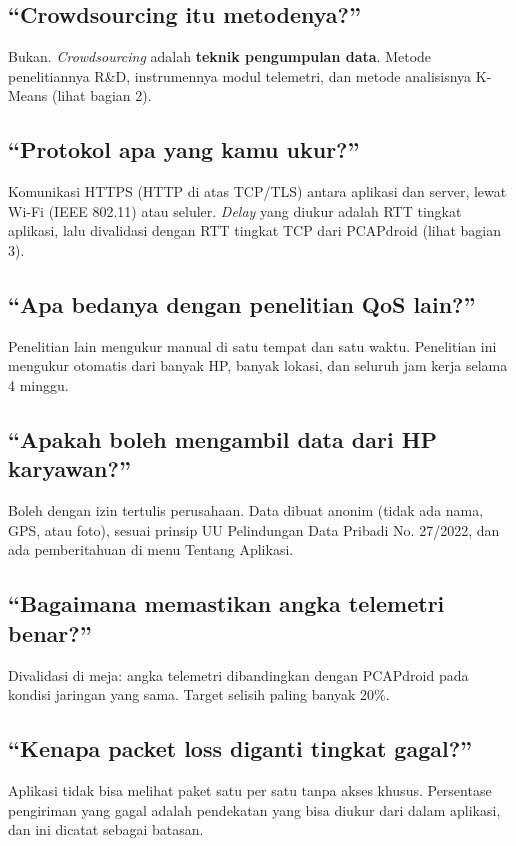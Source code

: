 \documentclass[11pt,a4paper]{article}
\begin{document}
\subsection{``Crowdsourcing itu metodenya?''}
Bukan. \textit{Crowdsourcing} adalah \textbf{teknik pengumpulan data}. Metode penelitiannya R\&D, instrumennya modul telemetri, dan metode analisisnya K-Means (lihat bagian 2).

\subsection{``Protokol apa yang kamu ukur?''}
Komunikasi HTTPS (HTTP di atas TCP/TLS) antara aplikasi dan server, lewat Wi-Fi (IEEE 802.11) atau seluler. \textit{Delay} yang diukur adalah RTT tingkat aplikasi, lalu divalidasi dengan RTT tingkat TCP dari PCAPdroid (lihat bagian 3).

\subsection{``Apa bedanya dengan penelitian QoS lain?''}
Penelitian lain mengukur manual di satu tempat dan satu waktu. Penelitian ini mengukur otomatis dari banyak HP, banyak lokasi, dan seluruh jam kerja selama 4 minggu.

\subsection{``Apakah boleh mengambil data dari HP karyawan?''}
Boleh dengan izin tertulis perusahaan. Data dibuat anonim (tidak ada nama, GPS, atau foto), sesuai prinsip UU Pelindungan Data Pribadi No. 27/2022, dan ada pemberitahuan di menu Tentang Aplikasi.

\subsection{``Bagaimana memastikan angka telemetri benar?''}
Divalidasi di meja: angka telemetri dibandingkan dengan PCAPdroid pada kondisi jaringan yang sama. Target selisih paling banyak 20\%.

\subsection{``Kenapa packet loss diganti tingkat gagal?''}
Aplikasi tidak bisa melihat paket satu per satu tanpa akses khusus. Persentase pengiriman yang gagal adalah pendekatan yang bisa diukur dari dalam aplikasi, dan ini dicatat sebagai batasan.
\end{document}
